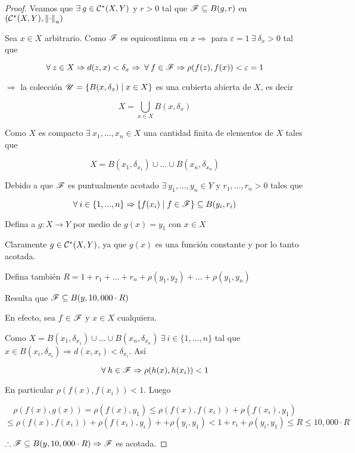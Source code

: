 \begin{proof}
    Veamos que $\exists \: g \in {\ensuremath{\mathcal{C}}}^{\ast}(X,Y)$ y $r > 0$ tal que $\mathscr{F} \subseteq B(g,r)$ en $({\mathcal{C}}^{\ast}(X,Y),{\norm{\cdot}}_{u})$

    Sea $x \in X$ arbitrario. Como $\mathscr{F}$ es equicontinua en $x \Rightarrow$ para $\varepsilon = 1 \: \exists \: \delta_x > 0$ tal que

    $$\forall \: z \in X \Rightarrow d(z,x) < \delta_x \Rightarrow \: \forall \: f \in \mathscr{F} \Rightarrow \rho(f(z),f(x)) < \varepsilon = 1$$

    $\Rightarrow$ la colección $\mathscr{U} = \{ B(x,\delta_x) \mid x \in X \}$ es una cubierta abierta de $X$, es decir

    $$X = \bigcup_{x \in X} B(x,\delta_x)$$

    Como $X$ es compacto $\exists \: x_1, ..., x_n \in X$ una cantidad finita de elementos de $X$ tales que

    $$X = B(x_1, \delta_{x_1}) \cup ... \cup B(x_n, \delta_{x_n})$$

    Debido a que $\mathscr{F}$ es puntualmente acotado $\exists \: y_1, ..., y_n \in Y$ y $r_1, ..., r_n > 0$ tales que

    $$\forall \: i \in \{1, ..., n \} \Rightarrow \{f(x_i) \mid f \in \mathscr{F} \} \subseteq B(y_i, r_i)$$

    Defina a $g : X \to Y$ por medio de $g(x) = y_1$ con $x \in X$

    Claramente $g \in {\ensuremath{\mathcal{C}}}^{\ast}(X,Y)$, ya que $g(x)$ es una función constante y por lo tanto acotada.

    Defina también $R = 1 + r_1 + ... + r_n + \rho(y_1,y_2) + ... + \rho(y_1, y_n)$

    Resulta que $\mathscr{F} \subseteq B(y, 10,000 \cdot R)$

    En efecto, sea $f \in \mathscr{F}$ y $x \in X$ cualquiera. 

    Como $X = B(x_1, \delta_{x_1}) \cup ... \cup B(x_n, \delta_{x_n}) \: \exists \: i \in \{1, ..., n \}$ tal que $x \in B(x_i, \delta_{x_i}) \Rightarrow d(x,x_i) < \delta_{x_i}$. Así
    
    $$\forall \: h \in \mathscr{F} \Rightarrow \rho(h(x),h(x_i)) < 1$$

    En particular $\rho(f(x),f(x_i)) < 1$. Luego

    $$\rho(f(x),g(x)) = \rho(f(x),y_1) \leqslant \rho(f(x),f(x_i)) + \rho(f(x_i),y_1)$$
    $$\leqslant \rho(f(x),f(x_i))  + \rho(f(x_i),y_i) +  + \rho(y_i,y_1) < 1 + r_i + \rho(y_i,y_1) \leqslant R \leqslant 10,000 \cdot R$$

    $\therefore \mathscr{F} \subseteq B(y, 10,000 \cdot R) \Rightarrow \mathscr{F}$ es acotada.
\end{proof}

